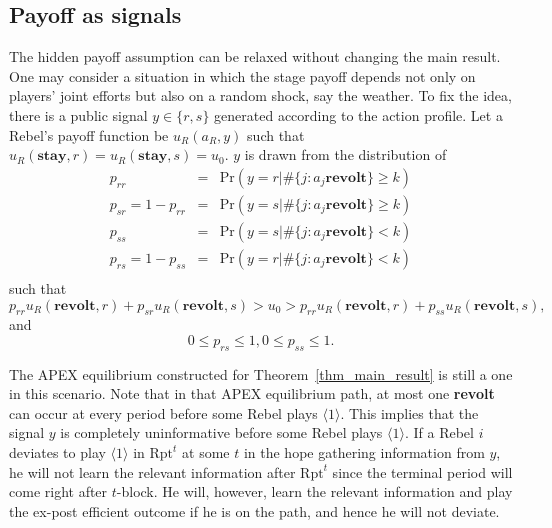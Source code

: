 \documentclass[12pt,letter]{article}
\newcommand{\Omicron}{\mathrm{Rpt}}
\theoremstyle{definition}
\theoremstyle{remark}
\theoremstyle{claim}
\begin{document}
\subsection{Payoff as signals}
The hidden payoff assumption can be relaxed without changing the main result. One may consider a situation in which the stage payoff depends not only on players' joint efforts but also on a random shock, say the weather. To fix the idea, there is a public signal $y\in \{r,s\}$ generated according to the action profile. Let a Rebel's payoff function be $u_{R}(a_{R},y)$ such that $u_{R}(\textbf{stay},r)=u_{R}(\textbf{stay},s)=u_0$. $y$ is drawn from the distribution of 
\begin{eqnarray*}
p_{rr} &=& \mathrm {Pr}(y=r|\#\{j:a_j\textbf{revolt}\}\geq k) \\
p_{sr}=1-p_{rr} &=& \mathrm {Pr}(y=s|\#\{j:a_j\textbf{revolt}\}\geq k) \\
p_{ss} &=& \mathrm {Pr}(y=s|\#\{j:a_j\textbf{revolt}\}< k) \\
p_{rs}=1-p_{ss} &=& \mathrm {Pr}(y=r|\#\{j:a_j\textbf{revolt}\}< k) \\
\end{eqnarray*}
such that
\begin{equation*}
p_{rr}u_{R}(\textbf{revolt}, r)+p_{sr}u_{R}(\textbf{revolt}, s)>u_0>p_{rr}u_{R}(\textbf{revolt}, r)+p_{ss}u_{R}(\textbf{revolt}, s),
\end{equation*}
and
\begin{equation*}
0\leq p_{rs}\leq 1,0\leq p_{ss}\leq 1.
\end{equation*}

The APEX equilibrium constructed for Theorem~\ref{thm_main_result} is still a one in this scenario. Note that in that APEX equilibrium path, at most one \textbf{revolt} can occur at every period before some Rebel plays $\langle 1 \rangle$. This implies that the signal $y$ is completely uninformative before some Rebel plays $\langle 1 \rangle$. If a Rebel $i$ deviates to play $\langle 1 \rangle$ in $\Omicron^t$ at some $t$ in the hope gathering information from $y$, he will not learn the relevant information after $\Omicron^t$ since the terminal period will come right after $t$-block. He will, however, learn the relevant information and play the ex-post efficient outcome if he is on the path, and hence he will not deviate.

\end{document}

